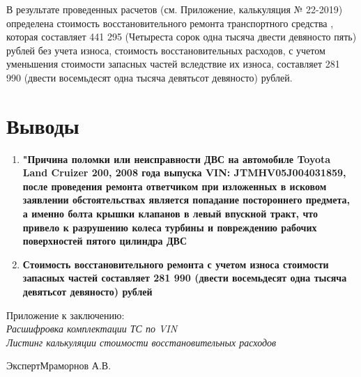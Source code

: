 %
В результате проведенных расчетов (см. Приложение, калькуляция № 22-2019) определена стоимость восстановительного ремонта транспортного средства  , которая составляет 441 295 (Четыреста сорок одна тысяча двести девяносто пять) рублей без учета износа,
стоимость восстановительных расходов, с учетом уменьшения стоимости запасных частей вследствие их износа,  составляет 281 990 (двести восемьдесят одна тысяча девятьсот девяносто) рублей.



\section{Выводы}


\begin{enumerate}
	\item \textbf{"Причина поломки или неисправности ДВС на автомобиле Toyota Land Cruizer 200, 2008 года выпуска VIN: JTMHV05J004031859, после проведения ремонта ответчиком при изложенных в исковом заявлении обстоятельствах является попадание постороннего предмета, а именно болта крышки клапанов в левый впускной тракт, что привело к разрушению колеса турбины и повреждению рабочих поверхностей пятого цилиндра ДВС}
	
	\vspace{5mm}
	
	\item \textbf{ Стоимость восстановительного ремонта с учетом износа стоимости запасных частей составляет 281 990 (двести восемьдесят одна тысяча девятьсот девяносто) рублей}
\end{enumerate}
\vspace{15mm}
\relax
Приложение к заключению:\\
\textit{
	Расшифровка комплектации ТС по VIN \\
	Листинг калькуляции стоимости восстановительных расходов\\
	   }

\vspace{20mm}

{Эксперт}\hfill           {Мраморнов А.В.}


%